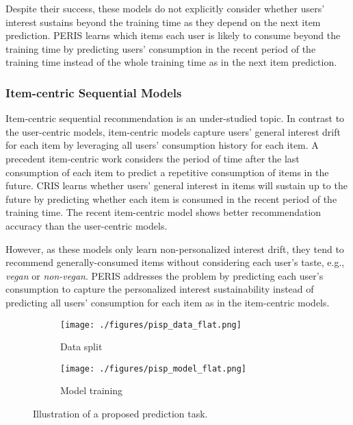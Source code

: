 \documentclass[sigconf]{acmart}
\newcommand{\MD}{{\small\textsf{PERIS}}}
\begin{document}
Despite their success, these models do not explicitly consider whether users’ interest sustains beyond the training time as they depend on the next item prediction. \MD{} learns which items each user is likely to consume beyond the training time by predicting users' consumption in the recent period of the training time instead of the whole training time as in the next item prediction. 

\subsubsection{\textbf{Item-centric Sequential Models}}
Item-centric sequential recommendation is an under-studied topic. 
In contrast to the user-centric models, item-centric models capture users' general interest drift for each item by leveraging all users' consumption history for each item.
A precedent item-centric work \cite{wang2019modeling} considers the period of time after the last consumption of each item to predict a repetitive consumption of items in the future. 
CRIS \cite{hyun2020interest} learns whether users' general interest in items will sustain up to the future by predicting whether each item is consumed in the recent period of the training time. The recent item-centric model \cite{hyun2020interest} shows better recommendation accuracy than the user-centric models.

However, as these models only learn non-personalized interest drift, they tend to recommend generally-consumed items without considering each user's taste, e.g., \textit{vegan} or \textit{non-vegan}. \MD{} addresses the problem by predicting each user's consumption to capture the personalized interest sustainability instead of predicting all users' consumption for each item as in the item-centric models.


\begin{figure}[t]
    \centering
    \begin{subfigure}[b]{0.39\linewidth}
         \centering
         \texttt{[image: ./figures/pisp\_data\_flat.png]}
         \caption{Data split}
         \label{fig:pisp_data}
     \end{subfigure}
     \begin{subfigure}[b]{0.6\linewidth}
         \centering
         \texttt{[image: ./figures/pisp\_model\_flat.png]}
         \caption{Model training}
         \label{fig:pisp_model}
     \end{subfigure}
    \caption{Illustration of a proposed prediction task.}
    \label{fig:pisp}
\end{figure}
\end{document}
